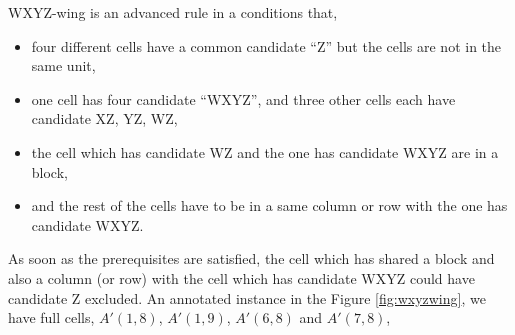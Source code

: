 \documentclass[11pt]{report}
\begin{document}
WXYZ-wing is an advanced rule in a conditions that,
\begin{itemize}
\item four different cells have a common candidate ``Z'' but the cells are not in the same unit,
\item one cell has four candidate ``WXYZ'', and three other cells each have candidate XZ, YZ, WZ,
\item the cell which has candidate WZ and the one has candidate WXYZ are in a block,
\item and the rest of the cells have to be in a same column or row with the one has candidate WXYZ.
\end{itemize}

As soon as the prerequisites are satisfied, the cell which has shared a block and also a column (or row) with the cell which has candidate WXYZ could have candidate Z excluded.
An annotated instance in the Figure \ref{fig:wxyzwing}, we have full cells, $A'(1,8)$, $A'(1,9)$, $A'(6,8)$ and $A'(7,8)$,
\end{document}
